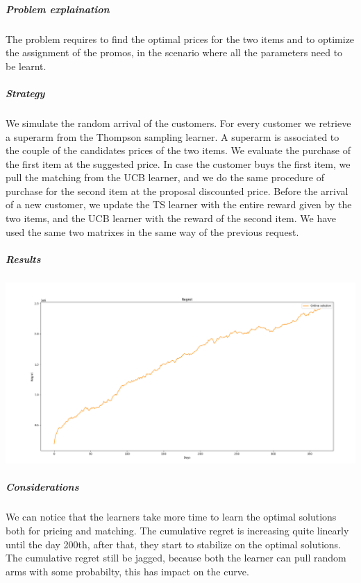 \subparagraph*{Problem explaination}
The problem requires to find the optimal prices for the two items and to optimize the assignment of the promos, in the scenario where all the parameters need to be learnt.
\subparagraph*{Strategy}
We simulate the random arrival of the customers. For every customer we retrieve a superarm from the Thompson sampling learner. A superarm is associated to the couple of the candidates prices of the two items. We evaluate the purchase of the first item at the suggested price. In case the customer buys the first item, we pull the matching from the UCB learner, and we do the same procedure of purchase for the second item at the proposal discounted price. Before the arrival of a new customer, we update the TS learner with the entire reward given by the two items, and the UCB learner with the reward of the second item. We have used the same two matrixes in the same way of the previous request.
\subparagraph*{Results}
\begin{center}
	\includegraphics[scale=0.35]{Images/n6}
\end{center}
\subparagraph*{Considerations}
We can notice that the learners take more time to learn the optimal solutions both for pricing and matching. The cumulative regret is increasing quite linearly until the day 200th, after that, they start to stabilize on the optimal solutions. The cumulative regret still be jagged, because both the learner can pull random arms with some probabilty, this has impact on the curve.